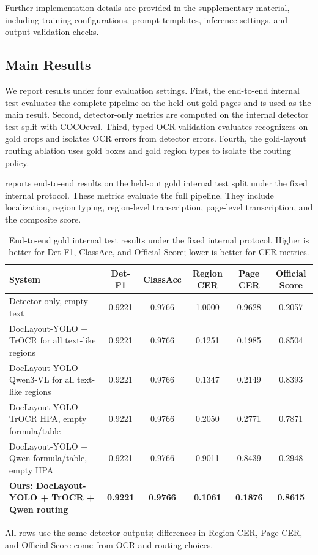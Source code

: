 \documentclass[runningheads]{llncs}
\newcommand{\metrichead}[1]{#1}
\newcommand{\tablenote}[1]{\vspace{2pt}\par\raggedright\scriptsize #1\par}
\begin{document}
Further implementation details are provided in the supplementary material, including training configurations, prompt templates, inference settings, and output validation checks.

\subsection{Main Results}
\label{sec:main-results}

We report results under four evaluation settings. First, the end-to-end internal test evaluates the complete pipeline on the held-out gold pages and is used as the main result. Second, detector-only metrics are computed on the internal detector test split with COCOeval. Third, typed OCR validation evaluates recognizers on gold crops and isolates OCR errors from detector errors. Fourth, the gold-layout routing ablation uses gold boxes and gold region types to isolate the routing policy.

 reports end-to-end results on the held-out gold internal test split under the fixed internal protocol. These metrics evaluate the full pipeline. They include localization, region typing, region-level transcription, page-level transcription, and the composite score.

\begin{table}[tb]
  \caption{End-to-end gold internal test results under the fixed internal protocol. Higher is better for Det-F1, ClassAcc, and Official Score; lower is better for CER metrics.}
  \label{tab:full-system-results}
  \centering
  \begingroup
  \scriptsize
  \setlength{\tabcolsep}{3pt}
  \renewcommand{\arraystretch}{1.05}
  \begin{tabularx}{\linewidth}{@{}Yccccc@{}}
    \toprule
    System & \metrichead{Det-F1} & \metrichead{ClassAcc} & \metrichead{Region CER} & \metrichead{Page CER} & \metrichead{Official Score} \\
    \midrule
    Detector only, empty text & 0.9221 & 0.9766 & 1.0000 & 0.9628	 & 0.2057 \\
    DocLayout-YOLO + TrOCR for all text-like regions & 0.9221 & 0.9766 & 0.1251	 & 0.1985 & 0.8504 \\
    DocLayout-YOLO + Qwen3-VL for all text-like regions & 0.9221 & 0.9766 & 0.1347 & 0.2149 & 0.8393 \\
    DocLayout-YOLO + TrOCR HPA, empty formula/table & 0.9221 & 0.9766 & 0.2050 & 0.2771 & 0.7871 \\
    DocLayout-YOLO + Qwen formula/table, empty HPA & 0.9221 & 0.9766 & 0.9011 & 0.8439 & 0.2948 \\
    \textbf{Ours: DocLayout-YOLO + TrOCR + Qwen routing} & \textbf{0.9221} & \textbf{0.9766} & \textbf{0.1061} & \textbf{0.1876	} & \textbf{0.8615} \\
    \bottomrule
  \end{tabularx}
  \vspace{2pt}
  \tablenote{All rows use the same detector outputs; differences in Region CER, Page CER, and Official Score come from OCR and routing choices.}
  \endgroup
\end{table}
\end{document}
